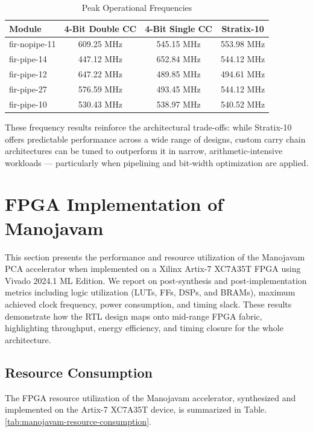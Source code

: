 \begin{table}[htb]
	\centering
	\fontsize{10}{12}\selectfont
	\caption{Peak Operational Frequencies}
	\label{tab:peak-operational-frequencies}
	\begin{tabular}{|p{3cm}|c|c|c|}
		\hline
		\textbf{Module}& \textbf {4-Bit Double CC} & \textbf {4-Bit Single CC} & \textbf{Stratix-10}\\
		\hline
		fir-nopipe-11 & 609.25 MHz & 545.15 MHz & 553.98 MHz\\\hline
		fir-pipe-14 & 447.12 MHz & 652.84 MHz & 544.12 MHz\\\hline
		fir-pipe-12 & 647.22 MHz & 489.85 MHz & 494.61 MHz\\\hline
		fir-pipe-27 & 576.59 MHz & 493.45 MHz & 544.12 MHz\\\hline
		fir-pipe-10 & 530.43 MHz & 538.97 MHz & 540.52 MHz\\\hline
		\end{tabular}
\end{table}

These frequency results reinforce the architectural trade-offs: while Stratix-10 offers predictable performance across a wide range of designs, custom carry chain architectures can be tuned to outperform it in narrow, arithmetic-intensive workloads — particularly when pipelining and bit-width optimization are applied.

\section{FPGA Implementation of Manojavam}
This section presents the performance and resource utilization of the Manojavam PCA accelerator when implemented on a Xilinx Artix-7 XC7A35T FPGA using Vivado 2024.1 ML Edition. We report on post-synthesis and post-implementation metrics including logic utilization (LUTs, FFs, DSPs, and BRAMs), maximum achieved clock frequency, power consumption, and timing slack. These results demonstrate how the RTL design maps onto mid-range FPGA fabric, highlighting throughput, energy efficiency, and timing closure for the whole architecture.

\subsection{Resource Consumption}
The FPGA resource utilization of the Manojavam accelerator, synthesized and implemented on the Artix-7 XC7A35T device, is summarized in Table.\ref{tab:manojavam-resource-consumption}.


